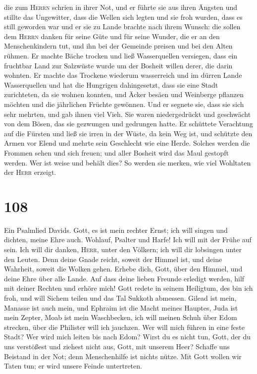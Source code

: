  die zum \textsc{Herrn} schrien in ihrer Not, und er
führte sie aus ihren Ängsten  und stillte das Ungewitter,
dass die Wellen sich legten  und sie froh wurden, dass es
still geworden war und er sie zu Lande brachte nach ihrem Wunsch:
 die sollen dem \textsc{Herrn} danken für seine Güte und
für seine Wunder, die er an den Menschenkindern tut,  und
ihn bei der Gemeinde preisen und bei den Alten rühmen. 
Er machte Bäche trocken und ließ Wasserquellen versiegen,
 dass ein fruchtbar Land zur Salzwüste wurde um der
Bosheit willen derer, die darin wohnten.  Er machte das
Trockene wiederum wasserreich und im dürren Lande Wasserquellen
 und hat die Hungrigen dahingesetzt, dass sie eine Stadt
zurichteten, da sie wohnen konnten,  und Äcker besäen und
Weinberge pflanzen möchten und die jährlichen Früchte gewönnen.
 Und er segnete sie, dass sie sich sehr mehrten, und gab
ihnen viel Vieh.  Sie waren niedergedrückt und geschwächt
von dem Bösen, das sie gezwungen und gedrungen hatte.  Er
schüttete Verachtung auf die Fürsten und ließ sie irren in der Wüste, da
kein Weg ist,  und schützte den Armen vor Elend und
mehrte sein Geschlecht wie eine Herde.  Solches werden
die Frommen sehen und sich freuen; und aller Bosheit wird das Maul
gestopft werden.  Wer ist weise und behält dies? So
werden sie merken, wie viel Wohltaten der \textsc{Herr} erzeigt.

\hypertarget{section-107}{%
\section{108}\label{section-107}}

 Ein Psalmlied Davids.  Gott, es ist mein
rechter Ernst; ich will singen und dichten, meine Ehre auch.
 Wohlauf, Psalter und Harfe! Ich will mit der Frühe auf
sein.  Ich will dir danken, \textsc{Herr}, unter den
Völkern; ich will dir lobsingen unter den Leuten.  Denn
deine Gnade reicht, soweit der Himmel ist, und deine Wahrheit, soweit
die Wolken gehen.  Erhebe dich, Gott, über den Himmel, und
deine Ehre über alle Lande.  Auf dass deine lieben Freunde
erledigt werden, hilf mit deiner Rechten und erhöre mich! 
Gott redete in seinem Heiligtum, des bin ich froh, und will Sichem
teilen und das Tal Sukkoth abmessen.  Gilead ist mein,
Manasse ist auch mein, und Ephraim ist die Macht meines Hauptes, Juda
ist mein Zepter,  Moab ist mein Waschbecken, ich will
meinen Schuh über Edom strecken, über die Philister will ich jauchzen.
 Wer will mich führen in eine feste Stadt? Wer wird mich
leiten bis nach Edom?  Wirst du es nicht tun, Gott, der
du uns verstößest und ziehest nicht aus, Gott, mit unserem Heer?
 Schaffe uns Beistand in der Not; denn Menschenhilfe ist
nichts nütze.  Mit Gott wollen wir Taten tun; er wird
unsere Feinde untertreten.

